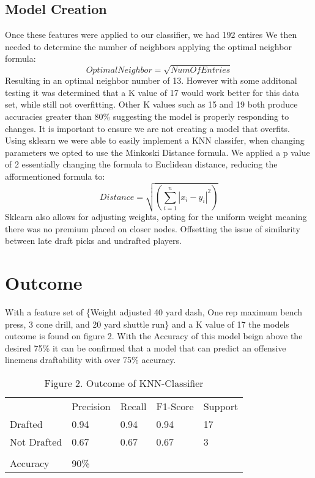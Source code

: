\documentclass[confrence]{IEEEtran}
\begin{document}
\subsection*{Model Creation}
Once these features were applied to our classifier, we had 192 entires
We then needed to determine the number of neighbors applying the optimal neighbor formula: \[OptimalNeighbor = \sqrt{NumOfEntries}\]
Resulting in an optimal neighbor number of 13.
However with some additonal testing it was determined that a K value of 17  would work better for this data set, while still not overfitting.
Other K values such as 15 and 19 both produce accuracies greater than 80\% suggesting the model is properly responding to changes. 
It is important to ensure we are not creating a model that overfits. 
Using sklearn we were able to easily implement a KNN classifer, when changing parameters we opted to use the Minkoski Distance formula.
We applied a p value of 2 essentially changing the formula to Euclidean distance, reducing the afformentioned formula to:
\[Distance = \sqrt{(\sum_{i=1}^n|x_i-y_i|^2)}\]
Sklearn also allows for adjusting weights, opting for the uniform weight meaning there was no premium placed on closer nodes.
Offsetting the issue of similarity between late draft picks and undrafted players.
\section*{Outcome}
With a feature set of \{Weight adjusted 40 yard dash, One rep maximum bench press, 3 cone drill, and 20 yard shuttle run\} and a K value of 17 the models outcome is found on figure 2.
With the Accuracy of this model beign above the desired 75\% it can be confirmed that a model that can predict an offensive linemens draftability with over 75\% accuracy.
\begin{table}[htbp]
\begin{tabular}{lllll}
            & Precision & Recall & F1-Score & Support \\
Drafted     & 0.94      & 0.94   & 0.94     & 17      \\
Not Drafted & 0.67      & 0.67   & 0.67     & 3       \\
            &           &        &          &         \\
Accuracy    & 90\%      &        &          &         \\
\end{tabular}
\caption{Figure 2. Outcome of KNN-Classifier}
\end{table}
\end{document}
